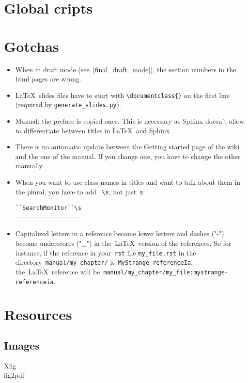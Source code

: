 \documentclass[a4paper,10pt]{article}
\newcommand{\code}[1]{\texttt{#1}}
\begin{document}
\section{Global cripts}
\label{global_scripts}


\section{Gotchas}

\begin{itemize}
 \item When in draft mode (see~\ref{final_draft_mode}), the section numbers in the html pages are wrong. 
 \item \LaTeX\ slides files have to start with \code{\textbackslash documentclass\{\}} on the first line (required by \code{generate\_slides.py}).
 \item Manual: the preface is copied once. This is necessary as Sphinx doesn't allow to differentiate between titles in \LaTeX\ and Sphinx.
 \item There is no automatic update between the Getting started page of the wiki and the one of the manual. If you change one, you have to change the other manually. 
 \item When you want to use class names in titles and want to talk about them in the plural, you have to add ~\verb+\s+, not just~\verb+s+:
  \begin{verbatim}
``SearchMonitor``\s
-------------------
  \end{verbatim}

  \item Capitalized letters in a reference become lower letters and dashes ("-") become underscores ("\_") in the~\LaTeX\ version of the references. So for instance, if the reference in your~\code{rst} file \code{my\_file.rst} in the directory~\code{manual/my\_chapter/} is~\code{MyStrange\_referenceIa}, the~\LaTeX~reference will be~\code{manual/my\_chapter/my\_file:mystrange-referenceia}. 
\end{itemize}

\section{Resources}

\subsection{Images}
\begin{description}
 \item[Xfig]
 \item[fig2pdf]
 \end{description}
\end{document}
